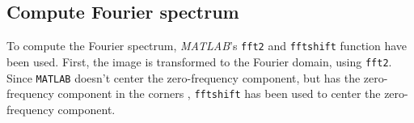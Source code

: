\setcounter{subsection}{0}
\subsection{Compute Fourier spectrum}
To compute the Fourier spectrum, \textit{MATLAB}'s \texttt{fft2} and \texttt{fftshift} function have been used.
First, the image is transformed to the Fourier domain, using \texttt{fft2}.
Since \texttt{MATLAB} doesn't center the zero-frequency component, but has the zero-frequency component in the corners \cite{fftshift}, \texttt{fftshift} has been used to center the zero-frequency component.

\clearpage
